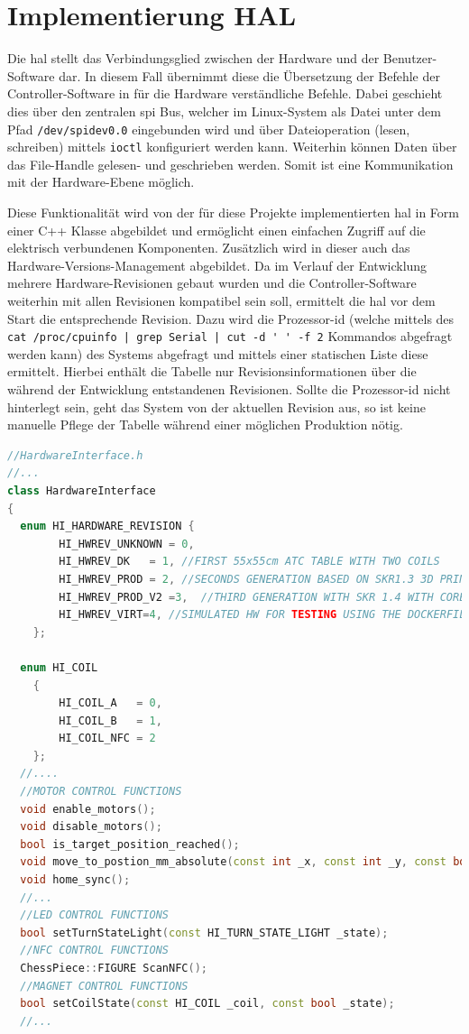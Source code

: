 \hypertarget{implementierung-hal}{%
\section{Implementierung HAL}\label{implementierung-hal}}

Die \gls{hal} stellt das Verbindungsglied zwischen der Hardware und der
Benutzer-Software dar. In diesem Fall übernimmt diese die Übersetzung
der Befehle der Controller-Software in für die Hardware verständliche
Befehle. Dabei geschieht dies über den zentralen \gls{spi} Bus, welcher
im Linux-System als Datei unter dem Pfad
\passthrough{\lstinline!/dev/spidev0.0!} eingebunden wird und über
Dateioperation (lesen, schreiben) mittels
\passthrough{\lstinline!ioctl!} konfiguriert werden kann. Weiterhin
können Daten über das File-Handle gelesen- und geschrieben werden. Somit
ist eine Kommunikation mit der Hardware-Ebene möglich.

Diese Funktionalität wird von der für diese Projekte implementierten
\gls{hal} in Form einer C++ Klasse abgebildet und ermöglicht einen
einfachen Zugriff auf die elektrisch verbundenen Komponenten. Zusätzlich
wird in dieser auch das Hardware-Versions-Management abgebildet. Da im
Verlauf der Entwicklung mehrere Hardware-Revisionen gebaut wurden und
die Controller-Software weiterhin mit allen Revisionen kompatibel sein
soll, ermittelt die \gls{hal} vor dem Start die entsprechende Revision.
Dazu wird die Prozessor-\gls{id} (welche mittels des
\passthrough{\lstinline!cat /proc/cpuinfo | grep Serial | cut -d ' ' -f 2!}
Kommandos abgefragt werden kann) des Systems abgefragt und mittels einer
statischen Liste diese ermittelt. Hierbei enthält die Tabelle nur
Revisionsinformationen über die während der Entwicklung entstandenen
Revisionen. Sollte die Prozessor-\gls{id} nicht hinterlegt sein, geht
das System von der aktuellen Revision aus, so ist keine manuelle Pflege
der Tabelle während einer möglichen Produktion nötig.

\begin{lstlisting}[language={C++}]
//HardwareInterface.h
//...
class HardwareInterface
{
  enum HI_HARDWARE_REVISION {
        HI_HWREV_UNKNOWN = 0,
        HI_HWREV_DK   = 1, //FIRST 55x55cm ATC TABLE WITH TWO COILS
        HI_HWREV_PROD = 2, //SECONDS GENERATION BASED ON SKR1.3 3D PRINT CONTROLLER
        HI_HWREV_PROD_V2 =3,  //THIRD GENERATION WITH SKR 1.4 WITH CORE XY MECHANIC
        HI_HWREV_VIRT=4, //SIMULATED HW FOR TESTING USING THE DOCKERFILE
    };

  enum HI_COIL
    {
        HI_COIL_A   = 0,
        HI_COIL_B   = 1,
        HI_COIL_NFC = 2
    };
  //....
  //MOTOR CONTROL FUNCTIONS
  void enable_motors();
  void disable_motors();
  bool is_target_position_reached();
  void move_to_postion_mm_absolute(const int _x, const int _y, const bool _blocking);
  void home_sync();
  //...
  //LED CONTROL FUNCTIONS
  bool setTurnStateLight(const HI_TURN_STATE_LIGHT _state);
  //NFC CONTROL FUNCTIONS
  ChessPiece::FIGURE ScanNFC();
  //MAGNET CONTROL FUNCTIONS
  bool setCoilState(const HI_COIL _coil, const bool _state);
  //...
\end{lstlisting}

